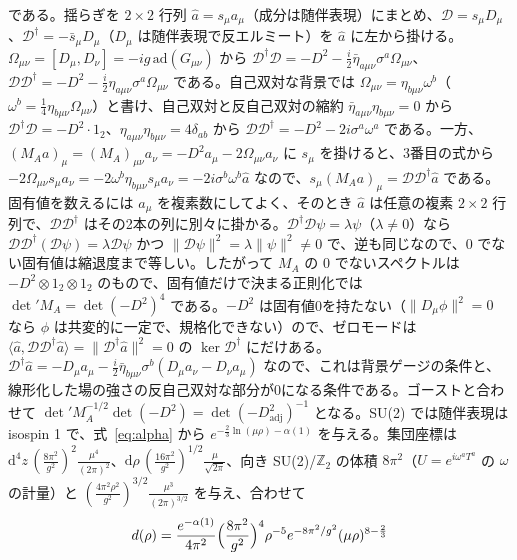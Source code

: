 \documentclass[a4paper,10pt]{ltjsarticle}
\newcommand{\dd}{\mathrm{d}}
\begin{document}
である。揺らぎを $2\times2$ 行列 $\hat a=s_\mu a_\mu$（成分は随伴表現）にまとめ、$\mathcal D=s_\mu D_\mu$、$\mathcal D^\dagger=-\bar s_\mu D_\mu$（$D_\mu$ は随伴表現で反エルミート）を $\hat a$ に左から掛ける。$\Omega_{\mu\nu}=[D_\mu,D_\nu]=-ig\,\mathrm{ad}(G_{\mu\nu})$ から $\mathcal D^\dagger\mathcal D=-D^2-\frac i2\bar\eta_{a\mu\nu}\sigma^a\Omega_{\mu\nu}$、$\mathcal D\mathcal D^\dagger=-D^2-\frac i2\eta_{a\mu\nu}\sigma^a\Omega_{\mu\nu}$ である。自己双対な背景では $\Omega_{\mu\nu}=\eta_{b\mu\nu}\omega^b$（$\omega^b=\frac14\eta_{b\mu\nu}\Omega_{\mu\nu}$）と書け、自己双対と反自己双対の縮約 $\bar\eta_{a\mu\nu}\eta_{b\mu\nu}=0$ から $\mathcal D^\dagger\mathcal D=-D^2\cdot1_2$、$\eta_{a\mu\nu}\eta_{b\mu\nu}=4\delta_{ab}$ から $\mathcal D\mathcal D^\dagger=-D^2-2i\sigma^a\omega^a$ である。一方、$(M_Aa)_\mu=(M_A)_{\mu\nu}a_\nu=-D^2a_\mu-2\Omega_{\mu\nu}a_\nu$ に $s_\mu$ を掛けると、3番目の式から $-2\Omega_{\mu\nu}s_\mu a_\nu=-2\omega^b\eta_{b\mu\nu}s_\mu a_\nu=-2i\sigma^b\omega^b\hat a$ なので、$s_\mu(M_Aa)_\mu=\mathcal D\mathcal D^\dagger\hat a$ である。固有値を数えるには $a_\mu$ を複素数にしてよく、そのとき $\hat a$ は任意の複素 $2\times2$ 行列で、$\mathcal D\mathcal D^\dagger$ はその2本の列に別々に掛かる。$\mathcal D^\dagger\mathcal D\psi=\lambda\psi$（$\lambda\neq0$）なら $\mathcal D\mathcal D^\dagger(\mathcal D\psi)=\lambda\mathcal D\psi$ かつ $\|\mathcal D\psi\|^2=\lambda\|\psi\|^2\neq0$ で、逆も同じなので、0 でない固有値は縮退度まで等しい。したがって $M_A$ の 0 でないスペクトルは $-D^2\otimes1_2\otimes1_2$ のもので、固有値だけで決まる正則化では $\det'M_A=\det(-D^2)^4$ である。$-D^2$ は固有値0を持たない（$\|D_\mu\phi\|^2=0$ なら $\phi$ は共変的に一定で、規格化できない）ので、ゼロモードは $\langle\hat a,\mathcal D\mathcal D^\dagger\hat a\rangle=\|\mathcal D^\dagger\hat a\|^2=0$ の $\ker\mathcal D^\dagger$ にだけある。$\mathcal D^\dagger\hat a=-D_\mu a_\mu-\frac i2\bar\eta_{b\mu\nu}\sigma^b(D_\mu a_\nu-D_\nu a_\mu)$ なので、これは背景ゲージの条件と、線形化した場の強さの反自己双対な部分が0になる条件である。ゴーストと合わせて $\det'M_A^{-1/2}\det(-D^2)=\det(-D^2_{\mathrm{adj}})^{-1}$ となる。SU(2) では随伴表現は isospin 1 で、式~\eqref{eq:alpha} から $e^{-\frac23\ln(\mu\rho)-\alpha(1)}$ を与える。集団座標は $\dd^4z\,(\frac{8\pi^2}{g^2})^2\frac{\mu^4}{(2\pi)^2}$、$\dd\rho\,(\frac{16\pi^2}{g^2})^{1/2}\frac\mu{\sqrt{2\pi}}$、向き SU(2)/$\mathbb Z_2$ の体積 $8\pi^2$（$U=e^{i\omega^aT^a}$ の $\omega$ の計量）と $(\frac{4\pi^2\rho^2}{g^2})^{3/2}\frac{\mu^3}{(2\pi)^{3/2}}$ を与え、合わせて
\begin{equation*}
d(\rho)=\frac{e^{-\alpha(1)}}{4\pi^2}\Bigl(\frac{8\pi^2}{g^2}\Bigr)^4\rho^{-5}e^{-8\pi^2/g^2}(\mu\rho)^{8-\frac23}
\end{equation*}
\end{document}
